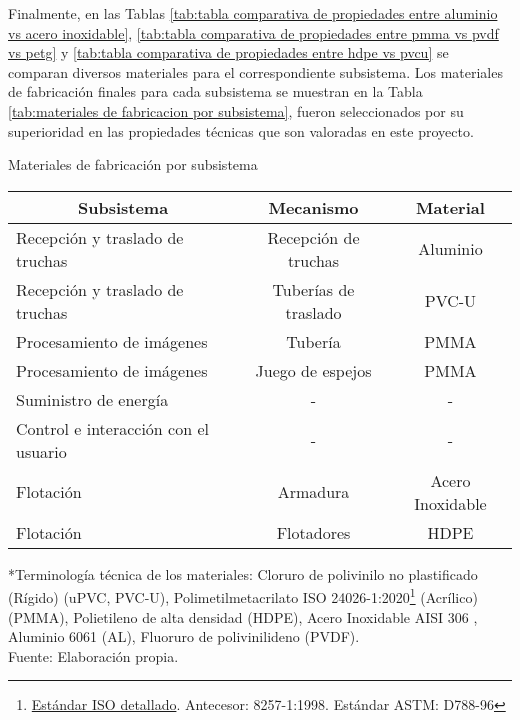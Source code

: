Finalmente, en las Tablas \ref{tab:tabla comparativa de propiedades entre aluminio vs acero inoxidable}, \ref{tab:tabla comparativa de propiedades entre pmma vs pvdf vs petg} y \ref{tab:tabla comparativa de propiedades entre hdpe vs pvcu} se comparan diversos materiales para el correspondiente subsistema. Los materiales de fabricación finales para cada subsistema se muestran en la Tabla \ref{tab:materiales de fabricacion por subsistema}, fueron seleccionados por su superioridad en las propiedades técnicas que son valoradas en este proyecto. 

\begin{savenotes}
	\begin{mytable}[H]
		\footnotesize\centering
		\caption{Materiales de fabricación por subsistema}
		\label{tab:materiales de fabricacion por subsistema}
		\begin{tabular}{|l|c|c|}
			\hline
			\multicolumn{1}{|c|}{\textbf{Subsistema}} & \multicolumn{1}{c|}{\textbf{Mecanismo}} & \textbf{Material} \\ \hline
			Recepción y traslado de truchas      & Recepción de truchas   & Aluminio  \\ \hline
			Recepción y traslado de truchas      & Tuberías de traslado   & PVC-U    \\ \hline
			Procesamiento de imágenes            & Tubería                & PMMA  \\ \hline
			Procesamiento de imágenes            & Juego de espejos       & PMMA  \\ \hline
			Suministro de energía                & \multicolumn{1}{c|}{-} & -    \\ \hline
			Control e interacción con el usuario & \multicolumn{1}{c|}{-} & -  \\ \hline
			Flotación                            & Armadura               & Acero Inoxidable \\ \hline
			Flotación                            & Flotadores             & HDPE  \\ \hline
		\end{tabular}
		\begin{myflushcenteraftertable}
		*Terminología técnica de los materiales: Cloruro de polivinilo no plastificado (Rígido) (uPVC, PVC-U), Polimetilmetacrilato ISO 24026-1:2020\footnote{\href{https://www.iso.org/standard/77547.html}{Estándar ISO detallado}. Antecesor: 8257-1:1998. Estándar ASTM: D788-96} (Acrílico) (PMMA), Polietileno de alta densidad (HDPE), Acero Inoxidable AISI 306 , Aluminio 6061 (AL), Fluoruro de polivinilideno (PVDF).\\	
		Fuente: Elaboración propia.
		\end{myflushcenteraftertable}
	\end{mytable}
\end{savenotes}

